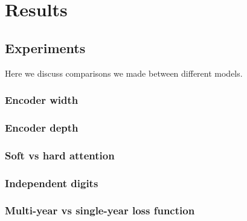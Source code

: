 \section{Results}



\subsection{Experiments}

Here we discuss comparisons we made between different models.

\subsubsection{Encoder width}

\subsubsection{Encoder depth}

\subsubsection{Soft vs hard attention}

\subsubsection{Independent digits} \label{sssec:ind_digits}

\subsubsection{Multi-year vs single-year loss function}
